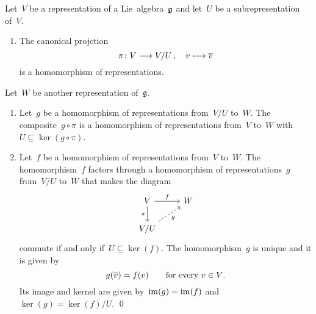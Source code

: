 \begin{proposition}
  \label{homomorphism theorem!for representations}
  Let~$V$ be a representation of a Lie~algebra~$\mathfrak{g}$ and let~$U$ be a subrepresentation of~$V$.
  \begin{enumerate}
    \item
      The canonical projction
      \[
        \pi
        \colon
        V
        \to
        V/U \,,
        \quad
        v
        \mapsto
        \class{v}
      \]
      is a homomorphism of representations. 
  \end{enumerate}
  Let~$W$ be another representation of~$\mathfrak{g}$.
  \begin{enumerate}[resume*]
    \item
      Let~$g$ be a homomorphism of representations from~$V/U$ to~$W$.
      The composite~$g \circ \pi$ is a homomorphism of representations from~$V$ to~$W$ with~$U \subseteq \ker(g \circ \pi)$.
    \item
      Let~$f$ be a homomorphism of representations from~$V$ to~$W$.
      The homomorphism~$f$ factors through a homomorphism of representations~$g$ from~$V/U$ to~$W$ that makes the diagram
      \[
        \begin{tikzcd}
          V
          \arrow{r}[above]{f}
          \arrow{d}[left]{\pi}
          &
          W
          \\
          V/U
          \arrow[dashed]{ur}[below right]{g}
          &
          {}
        \end{tikzcd}
      \]
      commute if and only if~$U \subseteq \ker(f)$.
      The homomorphism~$g$ is unique and it is given by
      \[
        g(\overline{v}) = f(v)
        \qquad
        \text{for every~$v \in V$.}
      \]
      Its image and kernel are given by~$\operatorname{im}(g) = \operatorname{im}(f)$ and~$\ker(g) = \ker(f)/U$.
    \qed
  \end{enumerate}
\end{proposition}


